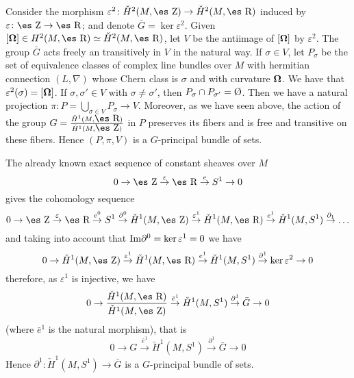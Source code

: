\documentclass[12pt]{article}
\def\dst{\(}
\def\map#1{\mathrel{\mathop{\to}\limits^{#1}}}
\def\buit{\hbox{\rm\O}}
\def\curv{{\bf \Omega}}
\def\Zahl{\mbox{\es Z}}
\def\Real{\mbox{\es R}}
\begin{document}
Consider the morphism
$\varepsilon^2 \colon \check H^2(M,\Zahl ) \to \check H^2(M,\Real )$
induced by $\varepsilon \colon \Zahl \to \Real$;
and denote $\bar G = \ker \varepsilon^2$.
Given $[\curv ] \in H^2(M,\Real ) \simeq \check H^2(M,\Real )$,
let $V$ be the antiimage of $[\curv ]$ by $\varepsilon^2$.
The group $\bar G$ acts freely an transitively in $V$ in the natural
way.
If $\sigma \in V$, let $P_\sigma$ be
the set of equivalence classes of complex line bundles
over $M$ with hermitian connection $(L,\nabla )$
whose Chern class is $\sigma$ and with curvature $\curv$.
We have that $\varepsilon^2(\sigma ) = [\curv ]$.
If $\sigma , \sigma' \in V$ with $\sigma \not= \sigma'$,
then $P_\sigma \cap P_{\sigma'} = \buit$.
Then we have a natural projection
$\pi \colon P = \bigcup_{\sigma \in V}P_\sigma \to V$.
Moreover, as we have seen above, the action of the group
\dst G =\frac{\check H^1(M,\Real )}{\check H^1(M,\Zahl )}\)
in $P$ preserves its fibers and is
free and transitive on these fibers.
Hence $(P,\pi ,V)$ is a $G$-principal bundle of sets.

The already known exact sequence of constant sheaves over $M$
$$
0 \to \Zahl \map{\varepsilon} \Real \map{e} S^1 \to 0
$$
gives the cohomology sequence
$$
0 \to \Zahl \map{\varepsilon} \Real \map{e^0} S^1
\map{\partial^0}
\check H^1(M,\Zahl ) \map{\varepsilon^1}
\check H^1(M,\Real ) \map{e^1}
\check H^1(M,S^1) \map{\partial_1} \ldots
$$
and taking into account that
${\rm Im}\partial^0 = \ker \varepsilon^1 = 0$
we have
$$
0 \to \check H^1(M,\Zahl ) \map{\varepsilon^1}
\check H^1(M,\Real ) \map{e^1}
\check H^1(M,S^1) \map{\partial^1}
\ker \varepsilon^2 \to 0
$$
therefore, as $\varepsilon^1$ is injective, we have
$$
0 \to \frac{\check H^1(M,\Real )}{\check H^1(M,\Zahl )}
\map{\bar e^1} \check H^1(M,S^1) \map{\partial^1} \bar G \to 0
$$
(where $\bar e^1$ is the natural morphism), that is
$$
0 \to G \map{\bar e^1} \check H^1(M,S^1) \map{\partial^1} \bar G \to 0
$$
Hence $\partial^1 \colon \check H^1(M,S^1) \to \bar G$
is a $G$-principal bundle of sets.
\end{document}
